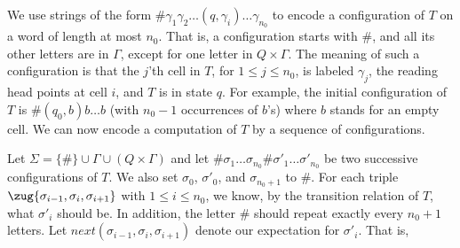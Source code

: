 \documentclass{lmcs}
\begin{document}
We use strings of the form $\# \gamma_1 \gamma_2 \ldots (q,\gamma_i) \ldots \gamma_{n_0}$ to encode a configuration of $T$ on a word of length at most $n_0$.
That is, a configuration starts with $\#$, and all its other letters
are in $\Gamma$, except for one letter in $Q \times \Gamma$.
The meaning of such a configuration is that the $j$'th cell in $T$, for
$1 \leq j \leq n_0$, is labeled $\gamma_j$, the reading head points
at cell $i$, and $T$ is in state $q$. For example, the initial
configuration of $T$ is
$\# (q_0,b) b \ldots b$ (with $n_0-1$ occurrences of $b$'s) where $b$
stands for an empty cell.
We can now encode a computation of $T$ by a sequence of configurations.


Let $\Sigma=\{\#\} \cup \Gamma \cup (Q \times \Gamma)$ and let
$\# \sigma_1 \ldots \sigma_{n_0} \# \sigma'_1 \ldots \sigma'_{n_0}$
be two successive configurations of $T$. We also set
$\sigma_0$, $\sigma'_0$, and $\sigma_{n_0+1}$ to $\#$.
For each triple $\zug{\sigma_{i-1},\sigma_i,\sigma_{i+1}}$ with $1
\leq i \leq n_0$, we know, by the transition relation of $T$, what
$\sigma'_i$ should be. In addition, the letter $\#$ should repeat
exactly every $n_0+1$ letters.
Let $next(\sigma_{i-1},\sigma_i,\sigma_{i+1})$ denote our
expectation for $\sigma'_i$. That is,
\end{document}
